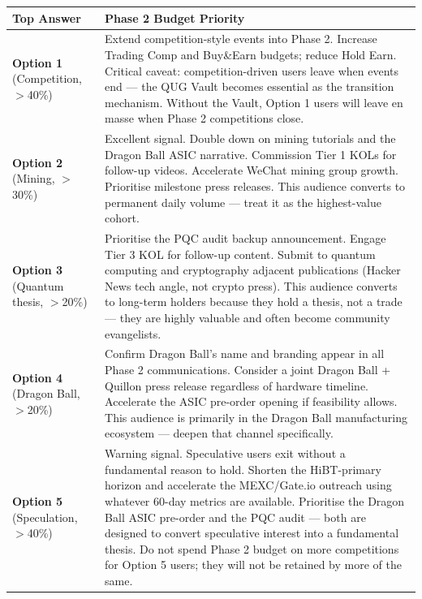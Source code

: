 \documentclass[11pt,a4paper]{article}
\begin{document}
\begin{center}
\begin{longtable}{C{2.5cm} L{10.5cm}}
  \toprule
  \textbf{Top Answer} & \textbf{Phase 2 Budget Priority} \\
  \midrule
  \endhead\bottomrule\endfoot

  \textbf{Option 1} (Competition, $>$40\%) &
    Extend competition-style events into Phase 2. Increase Trading Comp and Buy\&Earn budgets; reduce Hold Earn. Critical caveat: competition-driven users leave when events end — the QUG Vault becomes essential as the transition mechanism. Without the Vault, Option 1 users will leave en masse when Phase 2 competitions close. \\

  \textbf{Option 2} (Mining, $>$30\%) &
    Excellent signal. Double down on mining tutorials and the Dragon Ball ASIC narrative. Commission Tier 1 KOLs for follow-up videos. Accelerate WeChat mining group growth. Prioritise milestone press releases. This audience converts to permanent daily volume — treat it as the highest-value cohort. \\

  \textbf{Option 3} (Quantum thesis, $>$20\%) &
    Prioritise the PQC audit backup announcement. Engage Tier 3 KOL for follow-up content. Submit to quantum computing and cryptography adjacent publications (Hacker News tech angle, not crypto press). This audience converts to long-term holders because they hold a thesis, not a trade — they are highly valuable and often become community evangelists. \\

  \textbf{Option 4} (Dragon Ball, $>$20\%) &
    Confirm Dragon Ball's name and branding appear in all Phase 2 communications. Consider a joint Dragon Ball + Quillon press release regardless of hardware timeline. Accelerate the ASIC pre-order opening if feasibility allows. This audience is primarily in the Dragon Ball manufacturing ecosystem — deepen that channel specifically. \\

  \textbf{Option 5} (Speculation, $>$40\%) &
    Warning signal. Speculative users exit without a fundamental reason to hold. Shorten the HiBT-primary horizon and accelerate the MEXC/Gate.io outreach using whatever 60-day metrics are available. Prioritise the Dragon Ball ASIC pre-order and the PQC audit — both are designed to convert speculative interest into a fundamental thesis. Do not spend Phase 2 budget on more competitions for Option 5 users; they will not be retained by more of the same. \\

\end{longtable}
\end{center}
\end{document}
